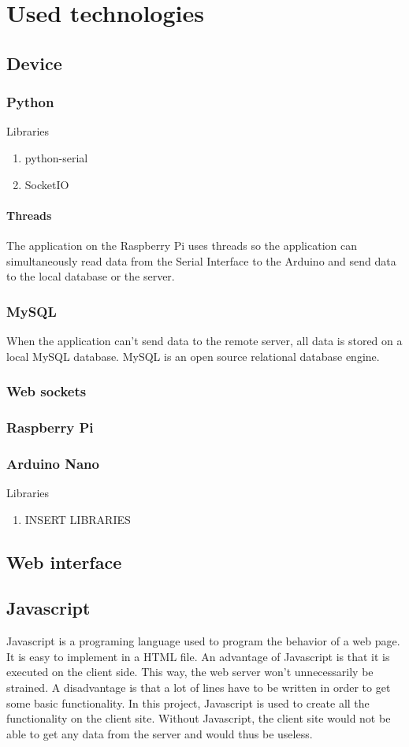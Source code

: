 \section{Used technologies}
\subsection{Device}
\subsubsection{Python}
Libraries
\begin{enumerate}
 \item python-serial
 \item SocketIO
\end{enumerate}
\paragraph{Threads}
The application on the Raspberry Pi uses threads so the application can simultaneously read data from the Serial Interface to the Arduino and send data to the local database or the server.
\subsubsection{MySQL}
When the application can't send data to the remote server, all data is stored on a local MySQL database. MySQL is an open source relational database engine.
\subsubsection{Web sockets}
\subsubsection{Raspberry Pi}
\subsubsection{Arduino Nano}
Libraries
\begin{enumerate}
 \item INSERT LIBRARIES
\end{enumerate}

\subsection{Web interface}
\subsection{Javascript}
Javascript is a programing language used to program the behavior of a web page. It is easy to implement in a HTML file. An advantage of Javascript is that it is executed on the client side. This way, the web server won't unnecessarily be strained. A disadvantage is that a lot of lines have to be written in order to get some basic functionality. 
In this project, Javascript is used to create all the functionality on the client site. Without Javascript, the client site would not be able to get any data from the server and would thus be useless. 

